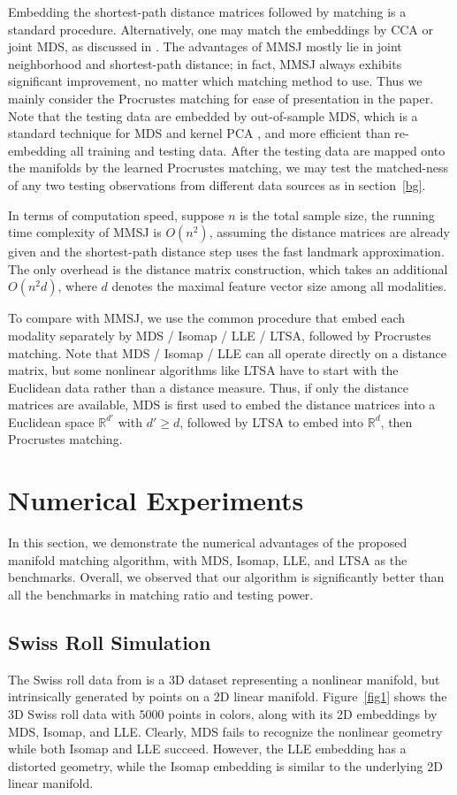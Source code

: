 \documentclass[times,twocolumn,final]{elsarticle}
\begin{document}
Embedding the shortest-path distance matrices followed by matching is a standard procedure. Alternatively, one may match the embeddings by CCA or joint MDS, as discussed in \citep{PriebeMarchette2012, FishkindShenPriebe2016}. The advantages of MMSJ mostly lie in joint neighborhood and shortest-path distance; in fact, MMSJ always exhibits significant improvement, no matter which matching method to use. Thus we mainly consider the Procrustes matching for ease of presentation in the paper. Note that the testing data are embedded by out-of-sample MDS, which is a standard technique for MDS and kernel PCA \citep{ScholkopfSmolaMuller1998,BengioEtal2003,TrossetPriebe2008}, and more efficient than re-embedding all training and testing data. After the testing data are mapped onto the manifolds by the learned Procrustes matching, we may test the matched-ness of any two testing observations from different data sources as in section~\ref{bg}.

In terms of computation speed, suppose $n$ is the total sample size, the running time complexity of MMSJ is $O(n^2)$, assuming the distance matrices are already given and the shortest-path distance step uses the fast landmark approximation. The only overhead is the distance matrix construction, which takes an additional $O(n^2 d)$, where $d$ denotes the maximal feature vector size among all modalities.

To compare with MMSJ, we use the common procedure that embed each modality separately by MDS / Isomap / LLE / LTSA, followed by Procrustes matching. Note that MDS / Isomap / LLE can all operate directly on a distance matrix, but some nonlinear algorithms like LTSA have to start with the Euclidean data rather than a distance measure. Thus, if only the distance matrices are available, MDS is first used to embed the distance matrices into a Euclidean space $\mathbb{R}^{d'}$ with $d' \geq d$, followed by LTSA to embed into $\mathbb{R}^{d}$, then Procrustes matching.

\section{Numerical Experiments}
\label{numer}
In this section, we demonstrate the numerical advantages of the proposed manifold matching algorithm, with MDS, Isomap, LLE, and LTSA as the benchmarks. Overall, we observed that our algorithm is significantly better than all the benchmarks in matching ratio and testing power. 

\subsection{Swiss Roll Simulation}
The Swiss roll data from \citep{TenenbaumSilvaLangford2000} is a 3D dataset representing a nonlinear manifold, but intrinsically generated by points on a 2D linear manifold. Figure~\ref{fig1} shows the 3D Swiss roll data with $5000$ points in colors, along with its 2D embeddings by MDS, Isomap, and LLE. Clearly, MDS fails to recognize the nonlinear geometry while both Isomap and LLE succeed. However, the LLE embedding has a distorted geometry, while the Isomap embedding is similar to the underlying 2D linear manifold.
\end{document}
